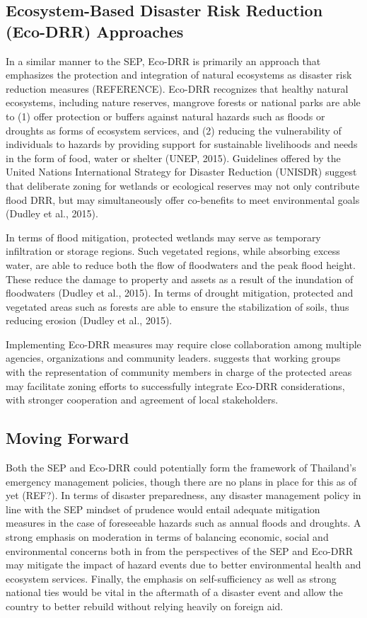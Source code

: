 \subsection{Ecosystem-Based Disaster Risk Reduction (Eco-DRR) Approaches}

In a similar manner to the SEP, Eco-DRR is primarily an approach that emphasizes the protection and integration of natural ecosystems as disaster risk reduction measures (REFERENCE). Eco-DRR recognizes that healthy natural ecosystems, including nature reserves, mangrove forests or national parks are able to (1) offer protection or buffers against natural hazards such as floods or droughts as forms of ecosystem services, and (2) reducing the vulnerability of individuals to hazards by providing support for sustainable livelihoods and needs in the form of food, water or shelter (UNEP, 2015). Guidelines offered by the United Nations International Strategy for Disaster Reduction (UNISDR) suggest that deliberate zoning for wetlands or ecological reserves may not only contribute flood DRR, but may simultaneously offer co-benefits to meet environmental goals (Dudley et al., 2015). 

In terms of flood mitigation, protected wetlands may serve as temporary infiltration or storage regions. Such vegetated regions, while absorbing excess water, are able to reduce both the flow of floodwaters and the peak flood height. These reduce the damage to property and assets as a result of the inundation of floodwaters (Dudley et al., 2015). In terms of drought mitigation, protected and vegetated areas such as forests are able to ensure the stabilization of soils, thus reducing erosion (Dudley et al., 2015).

Implementing Eco-DRR measures may require close collaboration among multiple agencies, organizations and community leaders. \citet{dudley2015protected} suggests that working groups with the representation of community members in charge of the protected areas may facilitate zoning efforts to successfully integrate Eco-DRR considerations, with stronger cooperation and agreement of local stakeholders.  

\subsection{Moving Forward}

Both the SEP and Eco-DRR could potentially form the framework of Thailand's emergency management policies, though there are no plans in place for this as of yet (REF?). In terms of disaster preparedness, any disaster management policy in line with the SEP mindset of prudence would entail adequate mitigation measures in the case of foreseeable hazards such as annual floods and droughts. A strong emphasis on moderation in terms of balancing economic, social and environmental concerns both in from the perspectives of the SEP and Eco-DRR may mitigate the impact of hazard events due to better environmental health and ecosystem services. Finally, the emphasis on self-sufficiency as well as strong national ties would be vital in the aftermath of a disaster event and allow the country to better rebuild without relying heavily on foreign aid.

